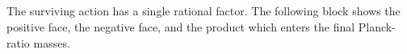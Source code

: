 \documentclass[11pt]{article}
\begin{document}
\begin{code}
\AgdaOperator{\AgdaInductiveConstructor{,}}\AgdaSpace{}%
\AgdaSymbol{(()}\AgdaSpace{}%
\AgdaOperator{\AgdaInductiveConstructor{,}}\AgdaSpace{}%
\AgdaSymbol{\AgdaUnderscore{}))}\<%
\\
\>[0]\AgdaSpace{}%
\AgdaSpace{}%
\AgdaSymbol{(()}\AgdaSpace{}%
\AgdaOperator{\AgdaInductiveConstructor{,}}\AgdaSpace{}%
\AgdaSymbol{\AgdaUnderscore{})}\<%
\\
\>[0]\AgdaSpace{}%
\AgdaSpace{}%
\AgdaSymbol{(\AgdaUnderscore{}}\AgdaSpace{}%
\AgdaOperator{\AgdaInductiveConstructor{,}}\AgdaSpace{}%
\AgdaSymbol{(\AgdaUnderscore{}}\AgdaSpace{}%
\AgdaOperator{\AgdaInductiveConstructor{,}}\AgdaSpace{}%
\AgdaSymbol{(()}\AgdaSpace{}%
\AgdaOperator{\AgdaInductiveConstructor{,}}\AgdaSpace{}%
\AgdaSymbol{\AgdaUnderscore{})))}\<%
\\
\>[0]\AgdaSpace{}%
\AgdaSpace{}%
\AgdaSymbol{\AgdaUnderscore{}}\AgdaSpace{}%
\AgdaSymbol{=}\AgdaSpace{}%
\<%
\\
\>[0]\AgdaSpace{}%
\AgdaSpace{}%
\AgdaSymbol{(\AgdaUnderscore{}}\AgdaSpace{}%
\AgdaOperator{\AgdaInductiveConstructor{,}}\AgdaSpace{}%
\AgdaSymbol{(\AgdaUnderscore{}}\AgdaSpace{}%
\AgdaOperator{\AgdaInductiveConstructor{,}}\AgdaSpace{}%
\AgdaSymbol{(\AgdaUnderscore{}}\AgdaSpace{}%
\AgdaOperator{\AgdaInductiveConstructor{,}}\AgdaSpace{}%
\AgdaSymbol{())))}\<%
\end{code}

The surviving action has a single rational factor.  The following block shows
the positive face, the negative face, and the product which enters the final
Planck-ratio masses.
\end{document}
